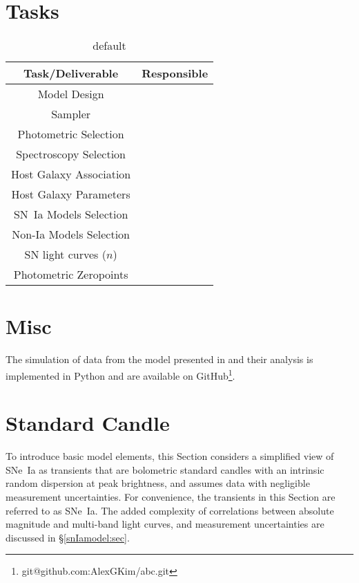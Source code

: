 \documentclass[preprint,3p]{elsarticle}
\begin{document}


\section{Tasks}
\begin{table}[htdp]
\caption{default}
\begin{center}
\begin{tabular}{|c|c|}
\hline
Task/Deliverable & Responsible \\ \hline
Model Design & \\
Sampler &\\
Photometric Selection &\\
Spectroscopy Selection &\\
Host Galaxy Association &\\
Host Galaxy Parameters &\\
SN~Ia Models Selection &\\
Non-Ia Models Selection &\\
SN light curves ($n$) &\\
Photometric Zeropoints &\\
\hline
\end{tabular}
\end{center}
\label{Tasks and Responsible Parties}
\end{table}%

\section{Misc}
The simulation of data from the model presented in
and their analysis is implemented in Python and are available
on GitHub\footnote{{git@github.com:AlexGKim/abc.git}}.


\section{Standard Candle}
\label{toy:sec}
To introduce basic model elements, this Section considers a
simplified view of SNe~Ia
as transients that are bolometric standard candles with an intrinsic random
dispersion
at peak brightness, and assumes data with negligible measurement uncertainties.
For convenience,
the transients
in this Section are  referred to as SNe~Ia.
The added complexity of correlations between absolute magnitude
and multi-band light curves, and measurement uncertainties
are discussed in
\S\ref{snIamodel:sec}. 
\end{document}
